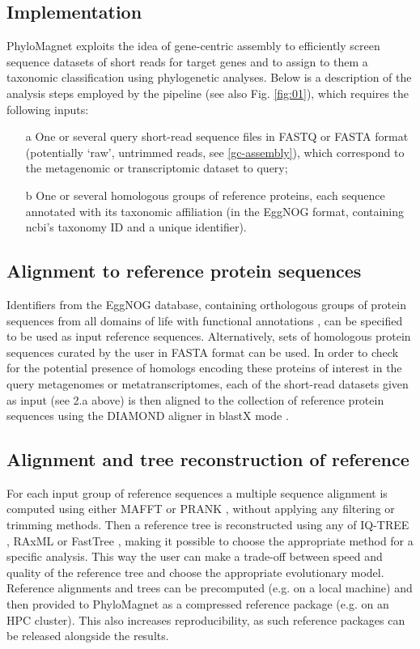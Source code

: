 \documentclass{bioinfo}
\begin{document}
\begin{methods}
\section{Implementation}
PhyloMagnet exploits the idea of gene-centric assembly \citep{Huson2017} to efficiently screen sequence datasets  of short reads for target genes and to assign to them a taxonomic classification using phylogenetic analyses. Below is a description of the analysis steps employed by the pipeline (see also Fig. \ref{fig:01}), which requires the following inputs: 
\begin{enumerate}

\item[a] One or several query short-read sequence files in FASTQ or FASTA format (potentially ‘raw’, untrimmed reads, see \ref{gc-assembly}), which correspond to the metagenomic or transcriptomic dataset to query;
\item[b] One or several homologous groups of reference proteins, each sequence annotated with its taxonomic affiliation (in the EggNOG format, containing ncbi’s taxonomy ID and a unique identifier).
\end{enumerate}

\subsection{Alignment to reference protein sequences}
Identifiers from the EggNOG database, containing orthologous groups of protein sequences from all domains of life with functional annotations \citep{Huerta-cepas2016b}, can be specified to be used as input reference sequences. Alternatively, sets of homologous protein sequences curated by the user in FASTA format can be used. In order to check for the potential presence of homologs encoding these proteins of interest in the query metagenomes or metatranscriptomes, each of the short-read datasets given as input (see 2.a above) is then aligned to the collection of reference protein sequences using the DIAMOND aligner in blastX mode \citep{Buchfink2014}.

\subsection{Alignment and tree reconstruction of reference}
For each input group of reference sequences a multiple sequence alignment is computed using either MAFFT \citep{Katoh2013}or PRANK \citep{Loytynoja2010}, without applying any filtering or trimming methods. Then a reference tree is reconstructed using any of IQ-TREE \citep{Nguyen2015}, RAxML \citep{Stamatakis2014} or FastTree \citep{Price2010}, making it possible to choose the appropriate method for a specific analysis. This way the user can make a trade-off between speed and quality of the reference tree and choose the appropriate evolutionary model. Reference alignments and trees can be precomputed (e.g. on a local machine) and then provided to PhyloMagnet as a compressed reference package (e.g. on an HPC cluster). This also increases reproducibility, as such reference packages can be released alongside the results.




\end{methods}
\end{document}
